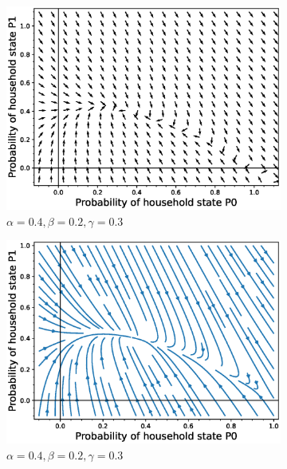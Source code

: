 \documentclass[paper=a4, fontsize=11pt, twoside, BCOR=12mm, parskip=full, listof=totoc]{scrreprt}
\begin{document}
{\begin{figure}[H]
	\centering
	\begin{subfigure}[b]{0.4\linewidth}
	  \includegraphics[width=\linewidth]{phase_portrait/023_b6.eps}
	  \caption{\(\alpha=0.4, \beta=0.2, \gamma=0.3\)}
	  \label{gamma three phasevectorfield}
	\end{subfigure}
	\begin{subfigure}[b]{0.4\linewidth}
	  \includegraphics[width=\linewidth]{phase_portrait/023_b6s.eps}
	  \caption{\(\alpha=0.4, \beta=0.2, \gamma=0.3\)}
	  \label{gamma three phasestreamplot}
	\end{subfigure}
    \begin{subfigure}[b]{0.4\linewidth}

\end{subfigure}
\end{figure}}
\end{document}
